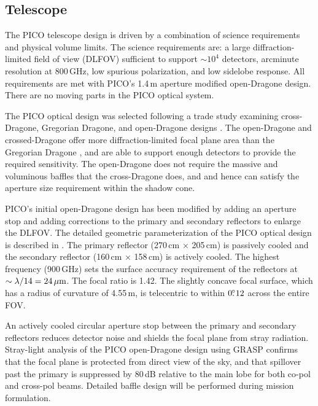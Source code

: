 \subsection{Telescope}
\label{sec:telescope} %

The PICO telescope design is driven by a combination of science
requirements and physical volume limits. The science requirements are:
a large diffraction-limited field of view (DLFOV) sufficient to
support $\sim10^4$ detectors, arcminute resolution at 800\,GHz, low
spurious polarization, and low sidelobe response. All
requirements are met with PICO's 1.4\,m aperture modified open-Dragone
design. There are no moving parts in the PICO optical system.

The PICO optical design was selected following a trade study examining
cross-Dragone, Gregorian Dragone, and open-Dragone designs
\citep{Young2018}.  The open-Dragone and crossed-Dragone offer more
diffraction-limited focal plane area than the Gregorian Dragone
\citep{deBernardis2018}, and are able to support enough detectors to
provide the required sensitivity. The open-Dragone does not require
the massive and voluminous baffles that the cross-Dragone does, and
and hence can satisfy the aperture size requirement within the shadow
cone.

PICO's initial open-Dragone design has been modified by adding an
aperture stop and adding corrections to the primary and secondary
reflectors to enlarge the DLFOV. The detailed geometric
parameterization of the PICO optical design is described in
\cite{Young2018}. The primary reflector (270\,cm $\times$ 205\,cm) is
passively cooled and the secondary reflector (160\,cm $\times$
158\,cm) is actively cooled. The highest frequency (900\,GHz) sets the
surface accuracy requirement of the reflectors at
$\sim \lambda/14 =24\,\mu{\rm m}$. The focal ratio is 1.42. The
slightly concave focal surface, which has a radius of curvature of
4.55\,m, is telecentric to within $0.\!\!^\circ12$ across the entire FOV.

An actively cooled circular aperture stop between the primary and
secondary reflectors reduces detector noise and shields the focal
plane from stray radiation. Stray-light analysis of the PICO
open-Dragone design using GRASP confirms that the focal plane is
protected from direct view of the sky, and that spillover past the
primary is suppressed by 80\,dB relative to the main lobe for both
co-pol and cross-pol beams. Detailed baffle design will be performed
during mission formulation.

